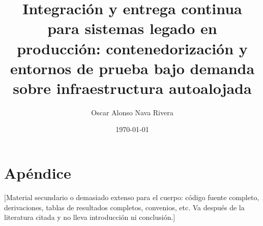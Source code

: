 \documentclass[12pt,letterpaper]{article}
\title{Integración y entrega continua para sistemas legado en producción:
contenedorización y entornos de prueba bajo demanda sobre infraestructura
autoalojada}
\author{Oscar Alonso Nava Rivera}
\date{\today}
\begin{document}


\clearpage





\newpage


\nocite{*}

\clearpage
\appendix
\section{Apéndice}
[Material secundario o demasiado extenso para el cuerpo: código fuente completo,
derivaciones, tablas de resultados completos, convenios, etc. Va después de la
literatura citada y no lleva introducción ni conclusión.]
\end{document}
